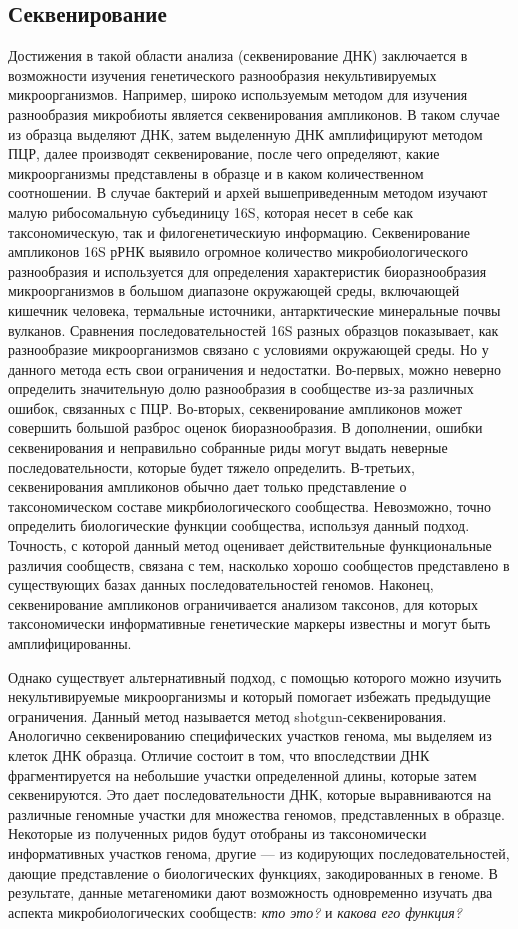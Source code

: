 \subsection{Секвенирование}
Достижения в такой области анализа (секвенирование ДНК) заключается в возможности изучения генетического разнообразия некультивируемых микроорганизмов. Например,
широко используемым методом для изучения разнообразия микробиоты является секвенирования ампликонов. В таком случае из образца выделяют ДНК, затем выделенную ДНК
амплифицируют методом ПЦР, далее производят секвенирование, после чего определяют,
какие микроорганизмы представлены в образце и в каком количественном соотношении. В
случае бактерий и архей вышеприведенным методом изучают малую рибосомальную субъединицу 16S, которая несет в себе как таксономическую, так и филогенетическиую информацию. Секвенирование ампликонов 16S рРНК выявило огромное количество микробиологического разнообразия и используется для определения характеристик биоразнообразия микроорганизмов в большом диапазоне окружающей среды, включающей кишечник человека,
термальные источники, антарктические минеральные почвы вулканов. Сравнения последовательностей 16S разных образцов показывает, как разнообразие микроорганизмов связано
с условиями окружающей среды. Но у данного метода есть свои ограничения и недостатки. Во-первых, можно неверно определить значительную долю разнообразия в сообществе
из-за различных ошибок, связанных с ПЦР. Во-вторых, секвенирование ампликонов может
совершить большой разброс оценок биоразнообразия. В дополнении, ошибки секвенирования и неправильно собранные риды могут выдать неверные последовательности, которые
будет тяжело определить. В-третьих, секвенирования ампликонов обычно дает только представление о таксономическом составе микрбиологического сообщества. Невозможно, точно
определить биологические функции сообщества, используя данный подход. Точность, с которой данный метод оценивает действительные функциональные различия сообществ, связана
с тем, насколько хорошо сообщестов представлено в существующих базах данных последовательностей геномов. Наконец, секвенирование ампликонов ограничивается анализом таксонов, для которых таксономически информативные генетические маркеры известны и могут
быть амплифицированны.

Однако существует альтернативный подход, с помощью которого можно изучить некультивируемые микроорганизмы и который помогает избежать предыдущие ограничения. Данный метод называется метод shotgun-секвенирования. Анологично секвенированию специфических участков генома, мы выделяем из клеток ДНК образца. Отличие состоит в том,
что впоследствии ДНК фрагментируется на небольшие участки определенной длины, которые затем
секвенируются. Это дает последовательности ДНК, которые выравниваются на различные
геномные участки для множества геномов, представленных в образце. Некоторые из полученных ридов будут отобраны из таксономически информативных участков генома, другие
— из кодирующих последовательностей, дающие представление о биологических функциях,
закодированных в геноме. В результате, данные метагеномики дают возможность одновременно изучать два аспекта микробиологических сообществ: \textit{кто это?} и \textit{какова его функция?}

